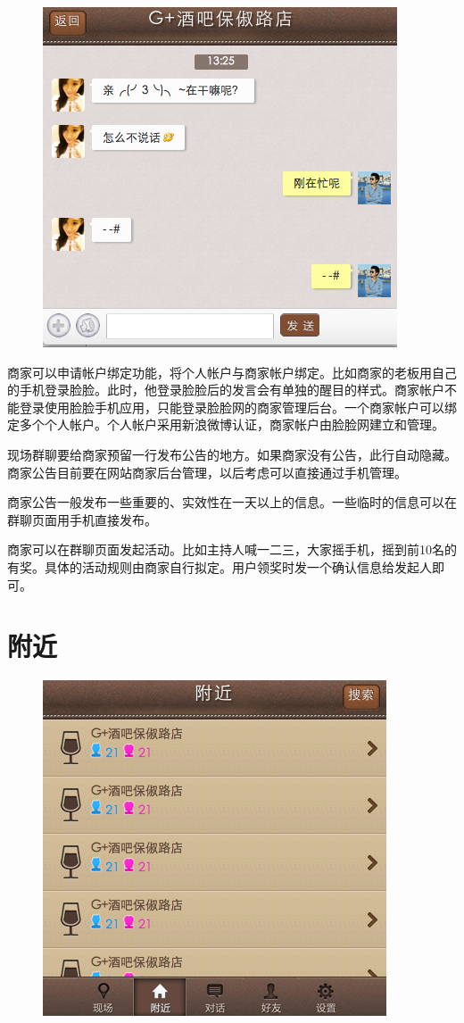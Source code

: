 \documentclass[cs4size]{ctexartutf8}
\begin{document}
\begin{figure}[H]
\centering
\includegraphics[scale=0.5]{./4.png}
\end{figure}

商家可以申请帐户绑定功能，将个人帐户与商家帐户绑定。比如商家的老板用自己的手机登录脸脸。此时，他登录脸脸后的发言会有单独的醒目的样式。商家帐户不能登录使用脸脸手机应用，只能登录脸脸网的商家管理后台。一个商家帐户可以绑定多个个人帐户。个人帐户采用新浪微博认证，商家帐户由脸脸网建立和管理。

现场群聊要给商家预留一行发布公告的地方。如果商家没有公告，此行自动隐藏。商家公告目前要在网站商家后台管理，以后考虑可以直接通过手机管理。

商家公告一般发布一些重要的、实效性在一天以上的信息。一些临时的信息可以在群聊页面用手机直接发布。


商家可以在群聊页面发起活动。比如主持人喊一二三，大家摇手机，摇到前10名的有奖。具体的活动规则由商家自行拟定。用户领奖时发一个确认信息给发起人即可。


\section{附近}

\begin{figure}[H]
\centering
\includegraphics[scale=0.5]{./5.png}
\end{figure}
\end{document}
